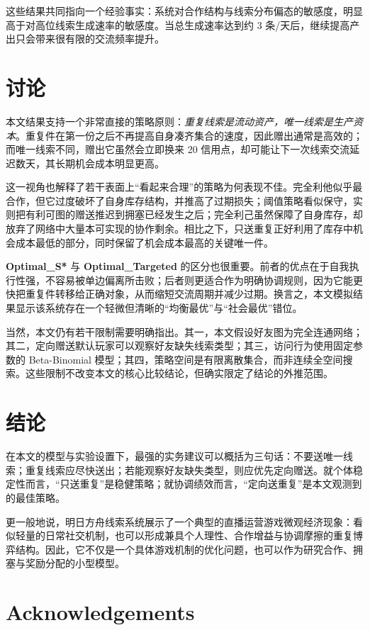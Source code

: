 \documentclass{rubbish}
\begin{document}
\begin{rubbishbody}
这些结果共同指向一个经验事实：系统对合作结构与线索分布偏态的敏感度，明显高于对高位线索生成速率的敏感度。当总生成速率达到约 3 条/天后，继续提高产出只会带来很有限的交流频率提升。

\section{讨论}

本文结果支持一个非常直接的策略原则：\textit{重复线索是流动资产，唯一线索是生产资本}。重复件在第一份之后不再提高自身凑齐集合的速度，因此赠出通常是高效的；而唯一线索不同，赠出它虽然会立即换来 20 信用点，却可能让下一次线索交流延迟数天，其长期机会成本明显更高。

这一视角也解释了若干表面上“看起来合理”的策略为何表现不佳。完全利他似乎最合作，但它过度破坏了自身库存结构，并推高了过期损失；阈值策略看似保守，实则把有利可图的赠送推迟到拥塞已经发生之后；完全利己虽然保障了自身库存，却放弃了网络中大量本可实现的协作剩余。相比之下，只送重复正好利用了库存中机会成本最低的部分，同时保留了机会成本最高的关键唯一件。

\textbf{Optimal\_S*} 与 \textbf{Optimal\_Targeted} 的区分也很重要。前者的优点在于自我执行性强，不容易被单边偏离所击败；后者则更适合作为明确协调规则，因为它能更快把重复件转移给正确对象，从而缩短交流周期并减少过期。换言之，本文模拟结果显示该系统存在一个轻微但清晰的“均衡最优”与“社会最优”错位。

当然，本文仍有若干限制需要明确指出。其一，本文假设好友图为完全连通网络；其二，定向赠送默认玩家可以观察好友缺失线索类型；其三，访问行为使用固定参数的 Beta-Binomial 模型；其四，策略空间是有限离散集合，而非连续全空间搜索。这些限制不改变本文的核心比较结论，但确实限定了结论的外推范围。

\section{结论}

在本文的模型与实验设置下，最强的实务建议可以概括为三句话：不要送唯一线索；重复线索应尽快送出；若能观察好友缺失类型，则应优先定向赠送。就个体稳定性而言，“只送重复”是稳健策略；就协调绩效而言，“定向送重复”是本文观测到的最佳策略。

更一般地说，明日方舟线索系统展示了一个典型的直播运营游戏微观经济现象：看似轻量的日常社交机制，也可以形成兼具个人理性、合作增益与协调摩擦的重复博弈结构。因此，它不仅是一个具体游戏机制的优化问题，也可以作为研究合作、拥塞与奖励分配的小型模型。

\section*{Acknowledgements}


\end{rubbishbody}
\end{document}
